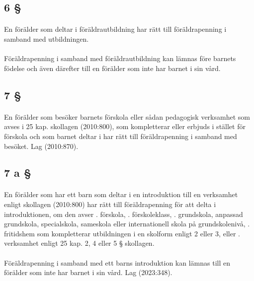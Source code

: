\documentclass[a4paper,notitlepage,openany,10pt]{book}
\begin{document}
\subsection*{6 §}
\paragraph*{}
En förälder som deltar i föräldrautbildning har rätt till föräldrapenning i samband med utbildningen.
\paragraph*{}
Föräldrapenning i samband med föräldrautbildning kan lämnas före barnets födelse och även därefter till en förälder som inte har barnet i sin vård.
\subsection*{7 §}
\paragraph*{}
En förälder som besöker barnets förskola eller sådan pedagogisk verksamhet som avses i 25 kap. skollagen (2010:800), som kompletterar eller erbjuds i stället för förskola och som barnet deltar i har rätt till föräldrapenning i samband med besöket.
Lag (2010:870).
\subsection*{7 a §}
\paragraph*{}
En förälder som har ett barn som deltar i en introduktion till en verksamhet enligt skollagen (2010:800) har rätt till föräldrapenning för att delta i introduktionen, om den avser
. förskola,
. förskoleklass,
. grundskola, anpassad grundskola, specialskola, sameskola eller internationell skola på grundskolenivå,
. fritidshem som kompletterar utbildningen i en skolform enligt 2 eller 3, eller
. verksamhet enligt 25 kap. 2, 4 eller 5 § skollagen.
\paragraph*{}
Föräldrapenning i samband med ett barns introduktion kan lämnas till en förälder som inte har barnet i sin vård.
Lag (2023:348).
\end{document}
